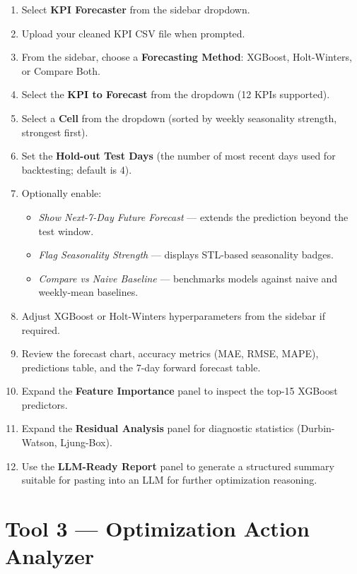 \begin{enumerate}
    \item Select \textbf{KPI Forecaster} from the sidebar dropdown.
    \item Upload your cleaned KPI CSV file when prompted.
    \item From the sidebar, choose a \textbf{Forecasting Method}: XGBoost, Holt-Winters, or Compare Both.
    \item Select the \textbf{KPI to Forecast} from the dropdown (12 KPIs supported).
    \item Select a \textbf{Cell} from the dropdown (sorted by weekly seasonality strength, strongest first).
    \item Set the \textbf{Hold-out Test Days} (the number of most recent days used for backtesting; default is 4).
    \item Optionally enable:
        \begin{itemize}
            \item \textit{Show Next-7-Day Future Forecast} — extends the prediction beyond the test window.
            \item \textit{Flag Seasonality Strength} — displays STL-based seasonality badges.
            \item \textit{Compare vs Naive Baseline} — benchmarks models against naive and weekly-mean baselines.
        \end{itemize}
    \item Adjust XGBoost or Holt-Winters hyperparameters from the sidebar if required.
    \item Review the forecast chart, accuracy metrics (MAE, RMSE, MAPE), predictions table, and the 7-day forward forecast table.
    \item Expand the \textbf{Feature Importance} panel to inspect the top-15 XGBoost predictors.
    \item Expand the \textbf{Residual Analysis} panel for diagnostic statistics (Durbin-Watson, Ljung-Box).
    \item Use the \textbf{LLM-Ready Report} panel to generate a structured summary suitable for pasting into an LLM for further optimization reasoning.
\end{enumerate}

\section{Tool 3 — Optimization Action Analyzer}


